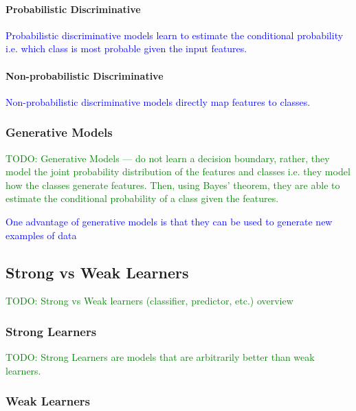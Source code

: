 \paragraph{Probabilistic Discriminative}

\textcolor{blue}{Probabilistic discriminative models learn to estimate the conditional probability i.e. which class is most probable given the input features.}

\paragraph{Non-probabilistic Discriminative}

\textcolor{blue}{Non-probabilistic discriminative models directly map features to classes.}

\subsubsection{Generative Models}

\textcolor{green}{TODO: Generative Models --- do not learn a decision boundary, rather, they model the joint probability distribution of the features and classes i.e. they model how the classes generate features. Then, using Bayes' theorem, they are able to estimate the conditional probability of a class given the features.}


\textcolor{blue}{One advantage of generative models is that they can be used to generate new examples of data}

\subsection{Strong vs Weak Learners}

\textcolor{green}{TODO: Strong vs Weak learners (classifier, predictor, etc.) overview}

\subsubsection{Strong Learners}

\textcolor{green}{TODO: Strong Learners are models that are arbitrarily better than weak learners.}

\subsubsection{Weak Learners}

